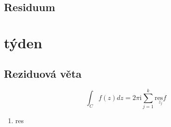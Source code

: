 \documentclass{article}
\newcommand{\mi}{\mathrm{i}}
\newcommand{\res}{\mathrm{res}}
\begin{document}
        \subsection{Residuum}

    \section{týden}%
    \subsection{Reziduová věta}
        \[\int_Cf(z)dz=2\pi\mi\sum_{j=1}^{k}\underset{z_j}{\res f}\]
        \begin{enumerate}
            \item res
        \end{enumerate}
\end{document}
